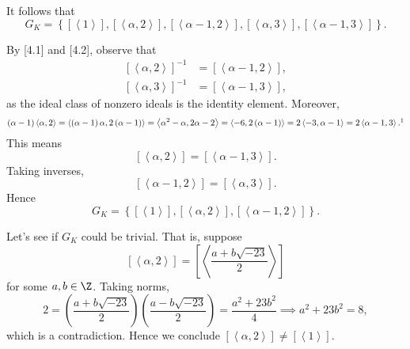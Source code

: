 \documentclass[pmath441]{subfiles}
\begin{document}
\begin{answer}
        It follows that
        \begin{equation*}
            G_K = \left\lbrace \left[ \left< 1 \right>  \right], \left[ \left< \alpha,2 \right>  \right], \left[ \left< \alpha-1,2 \right>  \right], \left[ \left< \alpha,3 \right>  \right], \left[ \left< \alpha-1,3 \right>  \right] \right\rbrace.
        \end{equation*}

        By [4.1] and [4.2], observe that
        \begin{equation*}
            \begin{aligned}
                \left[ \left< \alpha,2 \right>  \right]^{-1} & = \left[ \left< \alpha-1,2 \right>  \right], \\
                \left[ \left< \alpha,3 \right>  \right]^{-1} & = \left[ \left< \alpha-1,3 \right>  \right],
            \end{aligned} 
        \end{equation*}
        as the ideal class of nonzero ideals is the identity element. Moreover,
        \begin{equation*}
            \left( \alpha-1 \right)\left< \alpha,2 \right> = \left< \left( \alpha-1 \right)\alpha,2\left( \alpha-1 \right) \right> = \left< \alpha^{2}-\alpha,2\alpha-2 \right> = \left< -6,2\left( \alpha-1 \right) \right> = 2\left< -3,\alpha-1 \right> = 2\left< \alpha-1,3 \right>.\footnotemark[1]
        \end{equation*}
        This means
        \begin{equation*}
            \left[ \left< \alpha,2 \right>  \right] = \left[ \left< \alpha-1,3 \right>  \right].
        \end{equation*}
        Taking inverses,
        \begin{equation*}
            \left[ \left< \alpha-1,2 \right>  \right] = \left[ \left< \alpha,3 \right>  \right].
        \end{equation*}
        Hence
        \begin{equation*}
            G_K = \left\lbrace \left[ \left< 1 \right>  \right], \left[ \left< \alpha,2 \right>  \right], \left[ \left< \alpha-1,2 \right>  \right] \right\rbrace.
        \end{equation*}

        Let's see if $G_K$ could be trivial. That is, suppose
        \begin{equation*}
            \left[ \left< \alpha,2 \right>  \right] = \left[ \left< \frac{a+b\sqrt{-23}}{2} \right>  \right]
        \end{equation*}
        for some $a,b\in\Z$. Taking norms,
        \begin{equation*}
            2 = \left( \frac{a+b\sqrt{-23}}{2} \right)\left( \frac{a-b\sqrt{-23}}{2} \right) = \frac{a^{2}+23b^{2}}{4} \implies a^{2}+23b^{2} = 8,
        \end{equation*}
        which is a contradiction. Hence we conclude $\left[ \left< \alpha,2 \right>  \right] \neq \left[ \left< 1 \right>  \right]$.


\end{answer}
\end{document}
